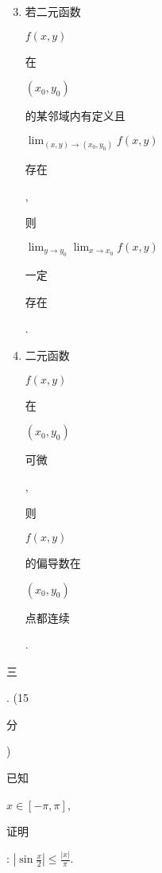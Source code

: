 \documentclass[10pt]{article}
\begin{document}
\begin{enumerate}
  \setcounter{enumi}{2}
  \item \begin{CJK}{UTF8}{mj}若二元函数\end{CJK} $f(x, y)$ \begin{CJK}{UTF8}{mj}在\end{CJK} $\left(x_{0}, y_{0}\right)$ \begin{CJK}{UTF8}{mj}的某邻域内有定义且\end{CJK} $\lim _{(x, y) \rightarrow\left(x_{0}, y_{0}\right)} f(x, y)$ \begin{CJK}{UTF8}{mj}存在\end{CJK}, \begin{CJK}{UTF8}{mj}则\end{CJK} $\lim _{y \rightarrow y_{0}} \lim _{x \rightarrow x_{0}} f(x, y)$ \begin{CJK}{UTF8}{mj}一定\end{CJK} \begin{CJK}{UTF8}{mj}存在\end{CJK}.

  \item \begin{CJK}{UTF8}{mj}二元函数\end{CJK} $f(x, y)$ \begin{CJK}{UTF8}{mj}在\end{CJK} $\left(x_{0}, y_{0}\right)$ \begin{CJK}{UTF8}{mj}可微\end{CJK}, \begin{CJK}{UTF8}{mj}则\end{CJK} $f(x, y)$ \begin{CJK}{UTF8}{mj}的偏导数在\end{CJK} $\left(x_{0}, y_{0}\right)$ \begin{CJK}{UTF8}{mj}点都连续\end{CJK}.

\end{enumerate}
\begin{CJK}{UTF8}{mj}三\end{CJK}. (15 \begin{CJK}{UTF8}{mj}分\end{CJK}) \begin{CJK}{UTF8}{mj}已知\end{CJK} $x \in[-\pi, \pi]$, \begin{CJK}{UTF8}{mj}证明\end{CJK}: $\left|\sin \frac{x}{2}\right| \leqslant \frac{|x|}{\pi}$.
\end{document}
